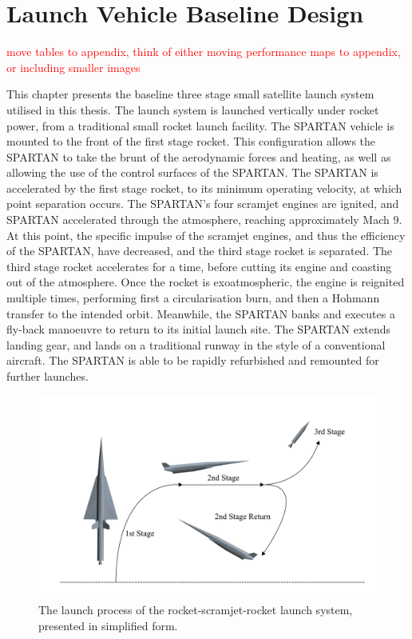 
\cleardoublepage
\chapter{Launch Vehicle Baseline Design}\label{chapter:methodology}





\textcolor{red}{move tables to appendix, think of either moving performance maps to appendix, or including smaller images}





This chapter presents the baseline three stage small satellite launch system utilised in this thesis. The launch system is launched vertically under rocket power, from a traditional small rocket launch facility. The SPARTAN vehicle is mounted to the front of the first stage rocket. This configuration allows the SPARTAN to take the brunt of the aerodynamic forces and heating, as well as allowing the use of the control surfaces of the SPARTAN. The SPARTAN is accelerated by the first stage rocket, to its minimum operating velocity, at which point separation occurs. The SPARTAN's four scramjet engines are ignited, and SPARTAN accelerated through the atmosphere, reaching approximately Mach 9. At this point, the specific impulse of the scramjet engines, and thus the efficiency of the SPARTAN, have decreased, and the third stage rocket is separated. The third stage rocket accelerates for a time, before cutting its engine and coasting out of the atmosphere. Once the rocket is exoatmospheric, the engine is reignited multiple times, performing first a circularisation burn, and then a Hohmann transfer to the intended orbit. Meanwhile, the SPARTAN banks and executes a fly-back manoeuvre to return to its initial launch site. The SPARTAN extends landing gear, and lands on a traditional runway in the style of a conventional aircraft. The SPARTAN is able to be rapidly refurbished and remounted for further launches. 


\begin{figure}
	\centering
	\includegraphics[width=0.9\linewidth]{figures/3_vehicle_design/Trajsimple}
	\caption{The launch process of the rocket-scramjet-rocket launch system, presented in simplified form.}
	\label{fig:Trajsimple}
\end{figure}

